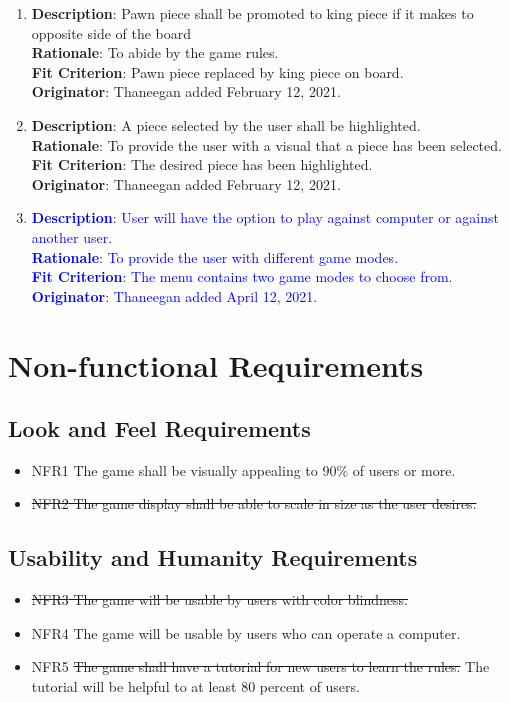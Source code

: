 \documentclass[12pt, titlepage]{article}
\begin{document}
\begin{enumerate}[{FR}1.]
    \item\textbf{Description}: Pawn piece shall be promoted to king piece if it makes to opposite side of the board\\
        \textbf{Rationale}: To abide by the game rules.\\
        \textbf{Fit Criterion}: Pawn piece replaced by king piece on board. \\
        \textbf{Originator}: Thaneegan added February 12, 2021.
        
    \item\textbf{Description}: A piece selected by the user shall be highlighted.\\
        \textbf{Rationale}: To provide the user with a visual that a piece has been selected.\\
        \textbf{Fit Criterion}: The desired piece has been highlighted. \\
        \textbf{Originator}: Thaneegan added February 12, 2021.
        
    \item \textcolor{blue}{\textbf{Description}: User will have the option to play against computer or against another user.\\
        \textbf{Rationale}: To provide the user with different game modes.\\
        \textbf{Fit Criterion}: The menu contains two game modes to choose from. \\
        \textbf{Originator}: Thaneegan added April 12, 2021.
        }
\end{enumerate}

\section{Non-functional Requirements}

\subsection{Look and Feel Requirements}
\begin{itemize}
    \item {NFR1} The game shall be visually appealing to 90\% of users or more.
    \item {\color{blue}\st{ {NFR2} The game display shall be able to scale in size as the user desires.}}
\end{itemize}

\subsection{Usability and Humanity Requirements}
\begin{itemize}
    \item {\color{blue}\st{ {NFR3} The game will be usable by users with color blindness.}}
    \item {NFR4} The game will be usable by users who can operate a computer.
    \item {NFR5} {\color{blue}\st{ The game shall have a tutorial for new users to learn the rules.}
    The tutorial will be helpful to at least 80 percent of users.}
\end{itemize}
\end{document}
